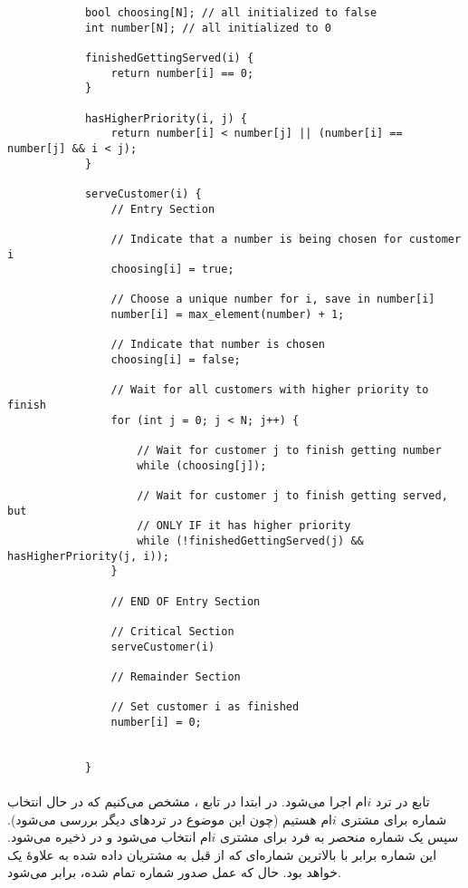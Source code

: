 \documentclass{article}
\begin{document}
	\begin{latin}
		\begin{lstlisting}
			bool choosing[N]; // all initialized to false
			int number[N]; // all initialized to 0

			finishedGettingServed(i) {
				return number[i] == 0;
			}

			hasHigherPriority(i, j) {
				return number[i] < number[j] || (number[i] == number[j] && i < j);
			}

			serveCustomer(i) {
				// Entry Section

				// Indicate that a number is being chosen for customer i
				choosing[i] = true;

				// Choose a unique number for i, save in number[i]
				number[i] = max_element(number) + 1;

				// Indicate that number is chosen
				choosing[i] = false;

				// Wait for all customers with higher priority to finish
				for (int j = 0; j < N; j++) {

					// Wait for customer j to finish getting number
					while (choosing[j]);

					// Wait for customer j to finish getting served, but
					// ONLY IF it has higher priority
					while (!finishedGettingServed(j) && hasHigherPriority(j, i));
				}

				// END OF Entry Section

				// Critical Section
				serveCustomer(i)

				// Remainder Section

				// Set customer i as finished
				number[i] = 0;


			}
		\end{lstlisting}
	\end{latin}

	\paragraph*{}
	تابع
	در ترد
	$i$ام
	اجرا می‌شود. در ابتدا در تابع
	،
	مشخص می‌کنیم که در حال انتخاب شماره برای مشتری
	$i$ام
	هستیم (چون این موضوع در
	تردهای دیگر بررسی می‌شود). سپس یک شماره منحصر به فرد برای مشتری
	$i$ام
	انتخاب می‌شود و در
	ذخیره می‌شود. این شماره برابر با بالاترین شماره‌ای که از قبل به مشتریان داده شده به علاوهٔ یک خواهد بود. حال که عمل صدور شماره تمام شده،
	برابر
	می‌شود.
\end{document}
